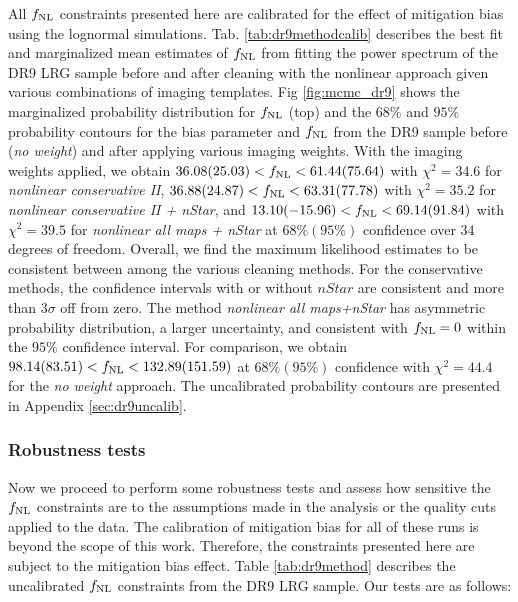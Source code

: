 All $f_{\rm NL}$ constraints presented here are calibrated for the effect of mitigation bias using the lognormal simulations. Tab. \ref{tab:dr9methodcalib} describes the best fit and marginalized mean estimates of $f_{\rm NL}$ from fitting the power spectrum of the DR9 LRG sample before and after cleaning with the nonlinear approach given various combinations of imaging templates. Fig \ref{fig:mcmc_dr9} shows the marginalized probability distribution for $f_{\rm NL}$ (top) and the $68\%$ and $95\%$ probability contours for the bias parameter and $f_{\rm NL}$ from the DR9 sample before (\textit{no weight}) and after applying various imaging weights. With the imaging weights applied, we obtain $36.08 (25.03) < f_{\rm NL} < 61.44(75.64)$ with $\chi^{2}=34.6$ for \textit{nonlinear conservative II}, $36.88(24.87) < f_{\rm NL} < 63.31(77.78)$ with $\chi^{2}=35.2$ for \textit{nonlinear conservative II + nStar}, and $13.10(-15.96) < f_{\rm NL} < 69.14(91.84)$ with $\chi^{2}=39.5$ for \textit{nonlinear all maps + nStar} at $68\% (95\%)$ confidence over 34 degrees of freedom. Overall, we find the maximum likelihood estimates to be consistent between among the various cleaning methods. For the conservative methods, the confidence intervals with or without $nStar$ are consistent and more than $3\sigma$ off from zero. The method \textit{nonlinear all maps+nStar} has asymmetric probability distribution, a larger uncertainty, and consistent with $f_{\rm NL}=0$ within the $95\%$ confidence interval. For comparison, we obtain $98.14(83.51) < f_{\rm NL} < 132.89(151.59)$ at $68\% (95\%)$ confidence with $\chi^{2}=44.4$ for the \textit{no weight} approach. The uncalibrated probability contours are presented in Appendix \ref{sec:dr9uncalib}.


\subsubsection{Robustness tests}
Now we proceed to perform some robustness tests and assess how sensitive the $f_{\rm NL}$ constraints are to the assumptions made in the analysis or the quality cuts applied to the data.  The calibration of mitigation bias for all of these runs is beyond the scope of this work. Therefore, the constraints presented here are subject to the mitigation bias effect. Table \ref{tab:dr9method} describes the uncalibrated $f_{\rm NL}$ constraints from the DR9 LRG sample. Our tests are as follows:

